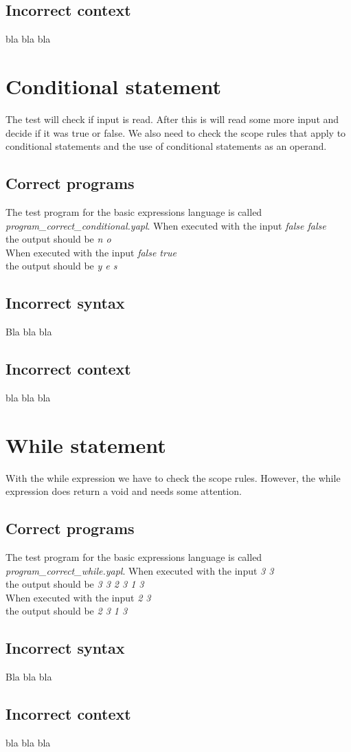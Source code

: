 \subsection{Incorrect context}
bla bla bla
\section{Conditional statement}
The test will check if input is read. After this is will read some more input and decide if it was true or false. We also need to check the scope rules that apply to conditional statements and the use of conditional statements as an operand.
\subsection{Correct programs}
The test program for the basic expressions language is called \emph{program_correct_conditional.yapl}. When executed with the input \emph{false false} \\the output should be \emph{n o}\\
When executed with the input \emph{false true} \\the output should be \emph{y e s}
\subsection{Incorrect syntax}
Bla bla bla
\subsection{Incorrect context}
bla bla bla
\section{While statement}
With the while expression we have to check the scope rules. However, the while expression does return a void and needs some attention. 
\subsection{Correct programs}
The test program for the basic expressions language is called \emph{program_correct_while.yapl}. When executed with the input \emph{3 3} \\the output should be \emph{3 3 2 3 1 3}\\
When executed with the input \emph{2 3} \\the output should be \emph{2 3 1 3}
\subsection{Incorrect syntax}
Bla bla bla
\subsection{Incorrect context}
bla bla bla